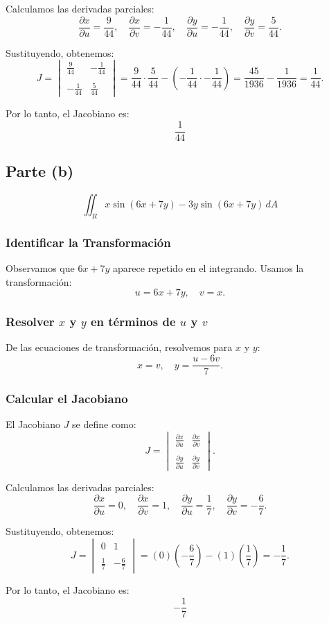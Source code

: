 Calculamos las derivadas parciales:
\[
\frac{\partial x}{\partial u} = \frac{9}{44}, \quad \frac{\partial x}{\partial v} = -\frac{1}{44}, \quad \frac{\partial y}{\partial u} = -\frac{1}{44}, \quad \frac{\partial y}{\partial v} = \frac{5}{44}.
\]

Sustituyendo, obtenemos:
\[
J = \begin{vmatrix}
\frac{9}{44} & -\frac{1}{44} \\\\
-\frac{1}{44} & \frac{5}{44}
\end{vmatrix} = \frac{9}{44} \cdot \frac{5}{44} - \left(-\frac{1}{44} \cdot -\frac{1}{44}\right) = \frac{45}{1936} - \frac{1}{1936} = \frac{1}{44}.
\]

Por lo tanto, el Jacobiano es:
\[
\boxed{\frac{1}{44}}
\]

\subsection*{Parte (b)}
\[
\iint_R x \sin(6x + 7y) - 3y \sin(6x + 7y) \, dA
\]

\subsubsection*{Identificar la Transformación}
Observamos que \(6x + 7y\) aparece repetido en el integrando. Usamos la transformación:
\[
u = 6x + 7y, \quad v = x.
\]

\subsubsection*{Resolver \(x\) y \(y\) en términos de \(u\) y \(v\)}
De las ecuaciones de transformación, resolvemos para \(x\) y \(y\):
\[
x = v, \quad y = \frac{u - 6v}{7}.
\]

\subsubsection*{Calcular el Jacobiano}
El Jacobiano \(J\) se define como:
\[
J = \begin{vmatrix}
\frac{\partial x}{\partial u} & \frac{\partial x}{\partial v} \\\\
\frac{\partial y}{\partial u} & \frac{\partial y}{\partial v}
\end{vmatrix}.
\]

Calculamos las derivadas parciales:
\[
\frac{\partial x}{\partial u} = 0, \quad \frac{\partial x}{\partial v} = 1, \quad \frac{\partial y}{\partial u} = \frac{1}{7}, \quad \frac{\partial y}{\partial v} = -\frac{6}{7}.
\]

Sustituyendo, obtenemos:
\[
J = \begin{vmatrix}
0 & 1 \\\\
\frac{1}{7} & -\frac{6}{7}
\end{vmatrix} = (0)(-\frac{6}{7}) - (1)(\frac{1}{7}) = -\frac{1}{7}.
\]

Por lo tanto, el Jacobiano es:
\[
\boxed{-\frac{1}{7}}
\]
